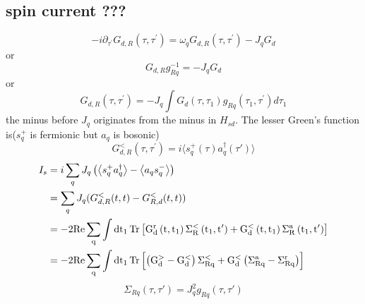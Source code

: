 \documentclass[11pt,a4paper]{article}
\begin{document}
\subsection{spin current ???}
\begin{equation}
-i \partial_{\tau^{\prime}} G_{d, R}\left(\tau, \tau^{\prime}\right)=\omega_{q} G_{d, R}\left(\tau, \tau^{\prime}\right)-J_{q} G_{d}
\end{equation}
or
\begin{equation}
G_{d, R} g_{R q}^{-1}=-J_{q} G_{d}
\end{equation}
or
\begin{equation}
G_{d, R}\left(\tau, \tau^{\prime}\right)=-J_{q} \int G_{d}\left(\tau, \tau_{1}\right) g_{R q}\left(\tau_{1}, \tau^{\prime}\right) d \tau_{1}
\end{equation}
the minus before $J_{q}$ originates from the minus in $H_{sd}$. The lesser Green's function is($s_{q}^{+}$ is fermionic but $a_{q}$ is bosonic)
\begin{equation}
G_{d, R}^{<}\left(\tau, \tau^{\prime}\right)=i\langle s_{q}^{+}(\tau) a_{q}^{\dag}(\tau')\rangle
\end{equation}
\begin{equation}
\begin{split}
I_{s}&= i \sum_{q} J_{q}\left(\left\langle s_{q}^{+} a_{q}^{\dagger}\right\rangle-\left\langle a_{q} s_{q}^{-}\right\rangle\right) \\
&=\sum_{q}J_{q}(G_{d,R}^{<}(t,t)-G_{R,d}^{<}(t,t)) \\
&=-2\rm{Re}\sum_{q} \int  d t_{1}\operatorname{Tr}\left[G_{d}^{r}\left(t, t_{1}\right) \Sigma_{R}^{<}\left(t_{1}, t^{\prime}\right)+G_{d}^{<}\left(t, t_{1}\right) \Sigma_{R}^{a}\left(t_{1}, t^{\prime}\right)\right]\\
&= -2\rm{Re}\sum_{q} \int  d t_{1}\operatorname{Tr}\left[\left(G_{d}^{>}-G_{d}^{<}\right) \Sigma_{R q}^{<}+G_{d}^{<}\left(\Sigma_{R q}^{a}-\Sigma_{R q}^{r}\right)\right]
\end{split}
\end{equation}
\begin{equation}
\Sigma_{Rq}(\tau, \tau')=J_{q}^{2}g_{Rq}(\tau, \tau')
\end{equation}
\end{document}
